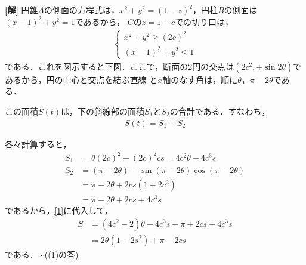 \documentclass[a4j]{jarticle}
\begin{document}
\setlength{\columnseprule}{0.4pt}
\begin{multicols}{2}
{\bf[解]} \1 円錐$A$の側面の方程式は，$x^2+y^2=(1-z)^2$，円柱$B$の側面は$(x-1)^2+y^2=1$であるから，
$C$の$z=1-c$での切り口は，
     \begin{align*}
          \begin{cases}
          x^2+y^2\ge(2c)^2 \\
          (x-1)^2+y^2\le1 
          \end{cases}
     \end{align*}
である．これを図示すると下図．ここで，断面の$2$円の交点は$(2c^2,\pm\sin2\theta)$であるから，円の中心と交点を結ぶ直線
と$x$軸のなす角は，順に$\theta$，$\pi-2\theta$である．
     \begin{center}
     \scalebox{.6}{}
     \end{center}
この面積$S(t)$は，下の斜線部の面積$S_1$と$S_2$の合計である．すなわち，
     \begin{align}
     S(t)=S_1+S_2\label{1}
     \end{align}
     
     \begin{minipage}{0.5\hsize}
          \begin{center}
          \scalebox{.7}{}
          \end{center}
     \end{minipage}
     \begin{minipage}{0.5\hsize}
           \begin{center}
           \scalebox{.7}{}
           \end{center}
     \end{minipage}
各々計算すると，
     \begin{align*}
     S_1&=\theta(2c)^2-(2c)^2cs=4c^2\theta-4c^3s \\
     S_2&=(\pi-2\theta)-\sin(\pi-2\theta)\cos(\pi-2\theta) \\
     &=\pi-2\theta+2cs(1+2c^2) \\
     &=\pi-2\theta+2cs+4c^3s
     \end{align*}
であるから，\eqref{1}に代入して，     
     \begin{align}
     S&=(4c^2-2)\theta-4c^3s+\pi+2cs+4c^3s \nonumber\\
     &=2\theta(1-2s^2)+\pi-2cs \label{2}
     \end{align}
である．$\cdots$((1)の答) 


\end{multicols}
\end{document}
